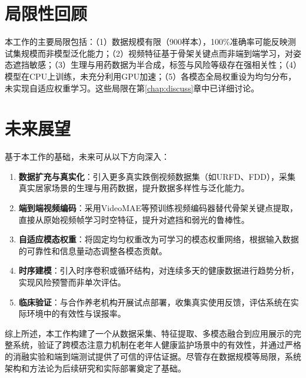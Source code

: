\section{局限性回顾}

本工作的主要局限包括：（1）数据规模有限（900样本），100\%准确率可能反映测试集规模而非模型泛化能力；（2）视频特征基于骨架关键点而非端到端学习，对姿态遮挡敏感；（3）生理与用药数据为半合成，标签与风险等级存在强相关性；（4）模型在CPU上训练，未充分利用GPU加速；（5）各模态全局权重设为均匀分布，未实现自适应权重学习。这些局限在第\ref{chap:discuss}章中已详细讨论。

\section{未来展望}

基于本工作的基础，未来可从以下方向深入：

\begin{enumerate}
    \item \textbf{数据扩充与真实化}：引入更多真实跌倒视频数据集（如URFD、FDD），采集真实居家场景的生理与用药数据，提升数据多样性与泛化能力。

    \item \textbf{端到端视频编码}：采用VideoMAE等预训练视频编码器替代骨架关键点提取，直接从原始视频帧学习时空特征，提升对遮挡和弱光的鲁棒性。

    \item \textbf{自适应模态权重}：将固定均匀权重改为可学习的模态权重网络，根据输入数据的可靠性和信息量动态调整各模态贡献。

    \item \textbf{时序建模}：引入时序卷积或循环结构，对连续多天的健康数据进行趋势分析，实现风险预警而非单次评估。

    \item \textbf{临床验证}：与合作养老机构开展试点部署，收集真实使用反馈，评估系统在实际环境中的有效性与误报率。
\end{enumerate}

综上所述，本工作构建了一个从数据采集、特征提取、多模态融合到应用展示的完整系统，验证了跨模态注意力机制在老年人健康监护场景中的有效性，并通过严格的消融实验和端到端测试提供了可信的评估证据。尽管存在数据规模等局限，系统架构和方法论为后续研究和实际部署奠定了基础。
